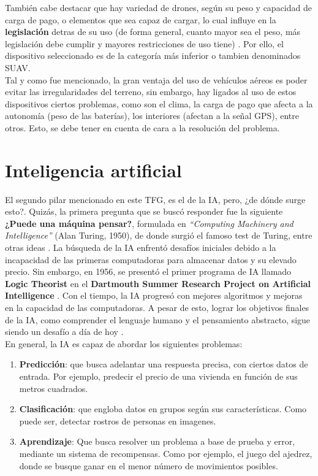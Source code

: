 También cabe destacar que hay variedad de drones, según su peso y capacidad de carga de pago, o elementos que sea capaz de cargar, lo cual influye en la \textbf{legislación} detras de su uso (de forma general, cuanto mayor sea el peso, más legislación debe cumplir y mayores restricciones de uso tiene) \cite{drone-regulation}. Por ello, el dispositivo seleccionado es de la categoría más inferior o tambien denominados \ac{SUAV}.\\

Tal y como fue mencionado, la gran ventaja del uso de vehículos aéreos es poder evitar las irregularidades del terreno, sin embargo, hay ligados al uso de estos dispositivos ciertos problemas, como son el clima, la carga de pago que afecta a la autonomía (peso de las baterías), los interiores (afectan a la señal GPS), entre otros. Esto, se debe tener en cuenta de cara a la resolución del problema.\\

\section{Inteligencia artificial}
\label{subsec:inteligencia_artificial}

El segundo pilar mencionado en este \ac{TFG}, es el de la \ac{IA}, pero, ¿de dónde surge esto?. Quizás, la primera pregunta que se buscó responder fue la siguiente \textbf{¿Puede una máquina pensar?}, formulada en \emph{``Computing Machinery and Intelligence''} (Alan Turing, 1950), de donde surgió el famoso test de Turing, entre otras ideas \cite{turing-paper}. La búsqueda de la \ac{IA} enfrentó desafíos iniciales debido a la incapacidad de las primeras computadoras para almacenar datos y su elevado precio. Sin embargo, en 1956, se presentó el primer programa de \ac{IA} llamado \textbf{Logic Theorist} en el \textbf{Dartmouth Summer Research Project on Artificial Intelligence} \cite{logic-theorist}. Con el tiempo, la IA progresó con mejores algoritmos y mejoras en la capacidad de las computadoras. A pesar de esto, lograr los objetivos finales de la IA, como comprender el lenguaje humano y el pensamiento abstracto, sigue siendo un desafío a día de hoy \cite{history-ai}.\\

En general, la \ac{IA} es capaz de abordar los siguientes problemas:

\begin{enumerate}
	\item \textbf{Predicción}: que busca adelantar una respuesta precisa, con ciertos datos de entrada. Por ejemplo, predecir el precio de una vivienda en función de sus metros cuadrados.

	\item \textbf{Clasificación}: que engloba datos en grupos según sus características. Como puede ser, detectar rostros de personas en imagenes.
	
    \item \textbf{Aprendizaje}: Que busca resolver un problema a base de prueba y error, mediante un sistema de recompensas. Como por ejemplo, el juego del ajedrez, donde se busque ganar en el menor número de movimientos posibles.
\end{enumerate} \cite{reg-class}

